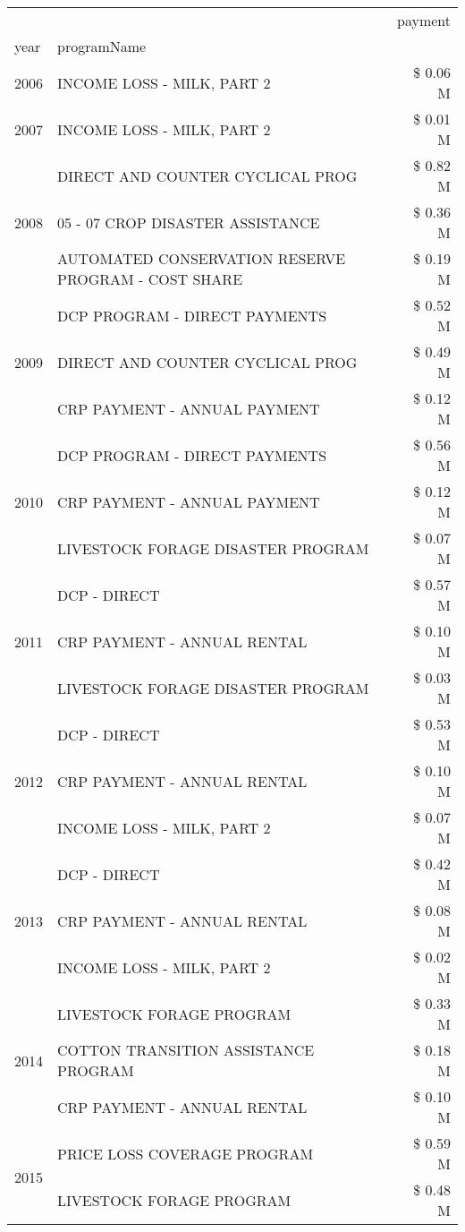 \begin{tabular}{llr}
\toprule
 &  & payment \\
year & programName &  \\
\midrule
2006 & INCOME LOSS - MILK, PART 2 & \$ 0.06 M \\
\cline{1-3}
2007 & INCOME LOSS - MILK, PART 2 & \$ 0.01 M \\
\cline{1-3}
\multirow[t]{3}{*}{2008} & DIRECT AND COUNTER CYCLICAL PROG & \$ 0.82 M \\
 & 05 - 07 CROP DISASTER ASSISTANCE & \$ 0.36 M \\
 & AUTOMATED CONSERVATION RESERVE PROGRAM - COST SHARE & \$ 0.19 M \\
\cline{1-3}
\multirow[t]{3}{*}{2009} & DCP PROGRAM - DIRECT PAYMENTS & \$ 0.52 M \\
 & DIRECT AND COUNTER CYCLICAL PROG & \$ 0.49 M \\
 & CRP PAYMENT - ANNUAL PAYMENT & \$ 0.12 M \\
\cline{1-3}
\multirow[t]{3}{*}{2010} & DCP PROGRAM - DIRECT PAYMENTS & \$ 0.56 M \\
 & CRP PAYMENT - ANNUAL PAYMENT & \$ 0.12 M \\
 & LIVESTOCK FORAGE DISASTER  PROGRAM & \$ 0.07 M \\
\cline{1-3}
\multirow[t]{3}{*}{2011} & DCP - DIRECT & \$ 0.57 M \\
 & CRP PAYMENT - ANNUAL RENTAL & \$ 0.10 M \\
 & LIVESTOCK FORAGE DISASTER PROGRAM & \$ 0.03 M \\
\cline{1-3}
\multirow[t]{3}{*}{2012} & DCP - DIRECT & \$ 0.53 M \\
 & CRP PAYMENT - ANNUAL RENTAL & \$ 0.10 M \\
 & INCOME LOSS - MILK, PART 2 & \$ 0.07 M \\
\cline{1-3}
\multirow[t]{3}{*}{2013} & DCP - DIRECT & \$ 0.42 M \\
 & CRP PAYMENT - ANNUAL RENTAL & \$ 0.08 M \\
 & INCOME LOSS - MILK, PART 2 & \$ 0.02 M \\
\cline{1-3}
\multirow[t]{3}{*}{2014} & LIVESTOCK FORAGE PROGRAM & \$ 0.33 M \\
 & COTTON TRANSITION ASSISTANCE PROGRAM & \$ 0.18 M \\
 & CRP PAYMENT - ANNUAL RENTAL & \$ 0.10 M \\
\cline{1-3}
\multirow[t]{3}{*}{2015} & PRICE LOSS COVERAGE PROGRAM & \$ 0.59 M \\
 & LIVESTOCK FORAGE PROGRAM & \$ 0.48 M \\

\end{tabular}
